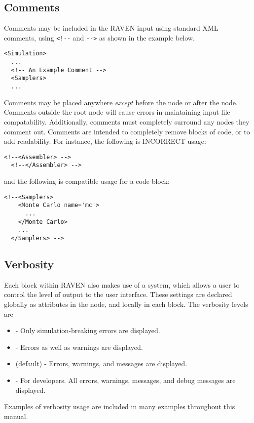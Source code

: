 \subsection{Comments}
Comments may be included in the RAVEN input using standard XML comments,
using \verb|<!--| and \verb|-->| as shown in the example below.
\begin{lstlisting}[style=XML]
<Simulation>
  ...
  <!-- An Example Comment -->
  <Samplers>
  ...
\end{lstlisting}
Comments may be placed anywhere \emph{except} before the 
node or after the  node.
%
Comments outside the root node will cause errors in maintaining input file
compatability.
%
Additionally, comments must completely surround any nodes they comment out.
%
Comments are intended to completely remove blocks of code, or to add readability.
%
For instance, the following is INCORRECT usage:
\begin{lstlisting}[style=XML]
  <!--<Assembler> -->
  <!--</Assembler> -->
\end{lstlisting}
%
and the following is compatible usage for a code block:
%
\begin{lstlisting}[style=XML]
  <!--<Samplers>
    <Monte Carlo name='mc'>
      ...
    </Monte Carlo>
    ...
  </Samplers> -->
\end{lstlisting}


\subsection{Verbosity}
\label{sec:verbosity}
Each block within RAVEN also makes use of a  system,
which allows a user to control the level of output to the user interface.
These settings are declared globally as attributes in the  node,
and locally in each block.  The verbosity levels are
\begin{itemize}
\item {} - Only simulation-breaking errors are displayed.
\item {} - Errors as well as warnings are displayed.
\item {} (default) - Errors, warnings, and messages are displayed.
\item {} - For developers. All errors, warnings, messages, and debug messages are displayed.
\end{itemize}
Examples of verbosity usage are included in many examples throughout this manual.


